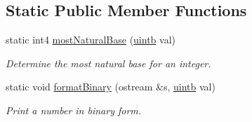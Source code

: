 \subsection*{Static Public Member Functions}
\begin{DoxyCompactItemize}
\item 
static int4 \mbox{\hyperlink{class_print_language_ae49714ea4a8560619b0a71850c2ca3c1}{most\+Natural\+Base}} (\mbox{\hyperlink{types_8h_a2db313c5d32a12b01d26ac9b3bca178f}{uintb}} val)
\begin{DoxyCompactList}\small\item\em Determine the most natural base for an integer. \end{DoxyCompactList}\item 
static void \mbox{\hyperlink{class_print_language_a32d76e94f94642915cfa67191de38a8a}{format\+Binary}} (ostream \&s, \mbox{\hyperlink{types_8h_a2db313c5d32a12b01d26ac9b3bca178f}{uintb}} val)
\begin{DoxyCompactList}\small\item\em Print a number in binary form. \end{DoxyCompactList}\end{DoxyCompactItemize}
